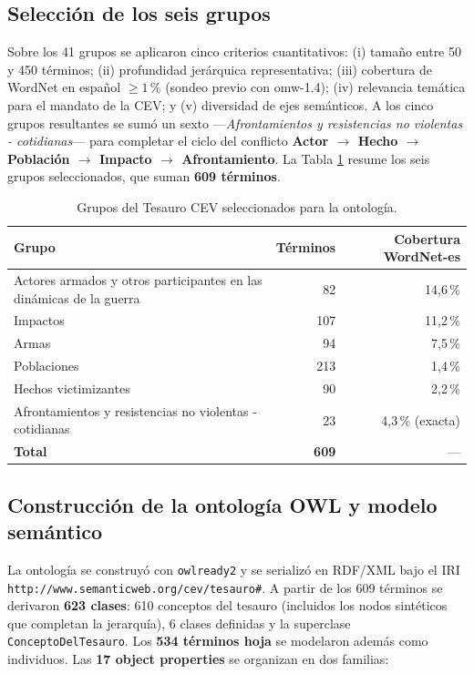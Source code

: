 \documentclass[11pt]{tg_usta}
\begin{document}
\subsection{Selección de los seis grupos}

Sobre los 41 grupos se aplicaron cinco criterios cuantitativos: (i) tamaño entre 50 y 450 términos; (ii) profundidad jerárquica representativa; (iii) cobertura de WordNet en español $\geq 1$\,\% (sondeo previo con omw-1.4); (iv) relevancia temática para el mandato de la CEV; y (v) diversidad de ejes semánticos. A los cinco grupos resultantes se sumó un sexto ---\textit{Afrontamientos y resistencias no violentas - cotidianas}--- para completar el ciclo del conflicto \textbf{Actor $\rightarrow$ Hecho $\rightarrow$ Población $\rightarrow$ Impacto $\rightarrow$ Afrontamiento}. La Tabla \ref{tab:grupos} resume los seis grupos seleccionados, que suman \textbf{609 términos}.

\begin{table}[H]
    \centering
    \caption{Grupos del Tesauro CEV seleccionados para la ontología.}
    \small
    \setlength{\tabcolsep}{4pt}
    \begin{tabular}{l r r}
    \hline
    Grupo & Términos & Cobertura WordNet-es \\
    \hline
    Actores armados y otros participantes en las dinámicas de la guerra & 82 & 14,6\,\% \\
    Impactos & 107 & 11,2\,\% \\
    Armas & 94 & 7,5\,\% \\
    Poblaciones & 213 & 1,4\,\% \\
    Hechos victimizantes & 90 & 2,2\,\% \\
    Afrontamientos y resistencias no violentas - cotidianas & 23 & 4,3\,\% (exacta) \\
    \hline
    \textbf{Total} & \textbf{609} & --- \\
    \hline
    \end{tabular}
    \label{tab:grupos}
\end{table}

\subsection{Construcción de la ontología OWL y modelo semántico}

La ontología se construyó con \texttt{owlready2} y se serializó en RDF/XML bajo el IRI \texttt{http://www.semanticweb.org/cev/tesauro\#}. A partir de los 609 términos se derivaron \textbf{623 clases}: 610 conceptos del tesauro (incluidos los nodos sintéticos que completan la jerarquía), 6 clases definidas y la superclase \texttt{ConceptoDelTesauro}. Los \textbf{534 términos hoja} se modelaron además como individuos. Las \textbf{17 object properties} se organizan en dos familias:
\end{document}
